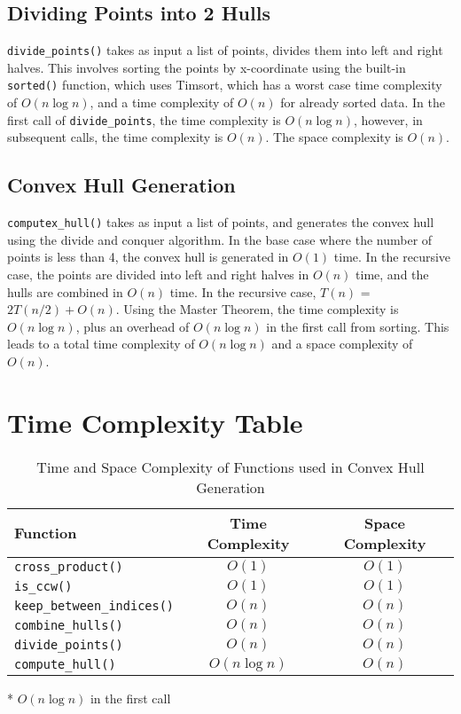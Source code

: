 \documentclass[12pt]{article}
\begin{document}
\subsection{Dividing Points into 2 Hulls}
\texttt{divide\_points()} takes as input a list of points, divides them
into left and right halves. This involves sorting the points by x-coordinate
using the built-in \texttt{sorted()} function, which uses Timsort, which has
a worst case time complexity of $O(n \log n)$, and a time complexity of
$O(n)$ for already sorted data. In the first call of \texttt{divide\_points},
the time complexity is $O(n \log n)$, however, in subsequent calls, the time
complexity is $O(n)$. The space complexity is $O(n)$.

\subsection{Convex Hull Generation}
\texttt{computex\_hull()} takes as input a list of points, and generates
the convex hull using the divide and conquer algorithm. In the base case
where the number of points is less than 4, the convex hull is generated
in $O(1)$ time. In the recursive case, the points are divided into left
and right halves in $O(n)$ time, and the hulls are combined in $O(n)$ time.
In the recursive case, $T(n)$ = $2T(n/2) + O(n)$. Using the Master Theorem,
the time complexity is $O(n \log n)$, plus an overhead of $O(n \log n)$ in
the first call from sorting. This leads to a total time complexity of
$O(n \log n)$ and a space complexity of $O(n)$.

\section{Time Complexity Table}
\begin{table}[h]
    \centering
    \begin{threeparttable}
        \begin{tabular}{@{}lcc@{}}
            \toprule
            \textbf{Function} & \textbf{Time Complexity} & \textbf{Space Complexity} \\ \midrule
            \texttt{cross\_product()} & $O(1)$ & $O(1)$ \\
            \texttt{is\_ccw()} & $O(1)$ & $O(1)$ \\
            \texttt{keep\_between\_indices()} & $O(n)$ & $O(n)$ \\
            \texttt{combine\_hulls()} & $O(n)$ & $O(n)$ \\
            \texttt{divide\_points()} & $O(n)$\tnote{*} & $O(n)$ \\ 
            \texttt{compute\_hull()} & $O(n \log n)$ & $O(n)$ \\ \bottomrule
        \end{tabular}
        \begin{tablenotes}
            \item[*] $O(n \log n)$ in the first call
        \end{tablenotes}
        \caption{Time and Space Complexity of Functions used in Convex Hull Generation}
        \label{tab:complexity}
    \end{threeparttable}
\end{table}
\end{document}
